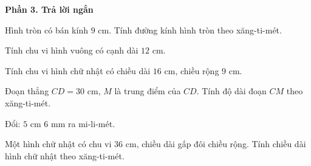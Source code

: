 \textbf{Phần 3. Trả lời ngắn}

\begin{ex} %
Hình tròn có bán kính $9\text{ cm}$. Tính đường kính hình tròn theo xăng-ti-mét.
\end{ex}

\begin{ex} %
Tính chu vi hình vuông có cạnh dài $12\text{ cm}$.
\end{ex}

\begin{ex} %
Tính chu vi hình chữ nhật có chiều dài $16\text{ cm}$, chiều rộng $9\text{ cm}$.
\end{ex}

\begin{ex} %
Đoạn thẳng $CD = 30\text{ cm}$, $M$ là trung điểm của $CD$. Tính độ dài đoạn $CM$ theo xăng-ti-mét.
\end{ex}

\begin{ex} %
Đổi: $5\text{ cm } 6\text{ mm}$ ra mi-li-mét.
\end{ex}

\begin{ex} %
Một hình chữ nhật có chu vi $36\text{ cm}$, chiều dài gấp đôi chiều rộng. Tính chiều dài hình chữ nhật theo xăng-ti-mét.
\end{ex}
